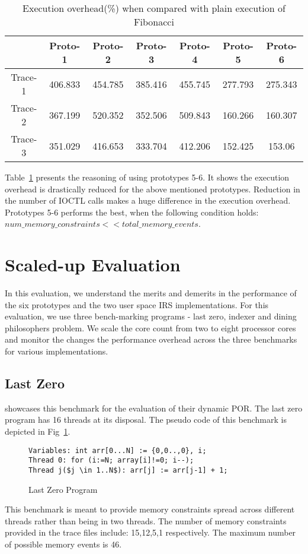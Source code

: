 \begin{table}[h]
\begin{center}
 \begin{tabular}{|c c c c c c c|} 
 \hline
 & Proto-1 & Proto-2 & Proto-3 & Proto-4 & Proto-5 & Proto-6\\ %
 \hline
 Trace-1 & 406.833 & 454.785 & 385.416 & 455.745 & 277.793 & 275.343 \\ 
 Trace-2 & 367.199 & 520.352 & 352.506 & 509.843 & 160.266 & 160.307 \\
 Trace-3 & 351.029 & 416.653 & 333.704 & 412.206 & 152.425 & 153.06\\
 \hline
\end{tabular}
\end{center}
\caption{Execution overhead(\%) when compared with plain execution of Fibonacci}
\label{fib_exec_over}
\end{table}

Table~\ref{fib_exec_over} presents the reasoning of using prototypes 5-6. 
It shows the execution overhead is drastically reduced for the above mentioned prototypes. 
Reduction in the number of IOCTL calls makes a huge difference in the execution overhead. 
Prototypes 5-6 performs the best, when the following condition holds:
$num\_memory\_constraints << total\_memory\_events$.

\section{Scaled-up Evaluation}

In this evaluation, we understand the merits and demerits in the performance of the six prototypes and the two user space IRS implementations. 
For this evaluation, we use three bench-marking programs - last zero, indexer and dining philosophers problem. 
We scale the core count from two to eight processor cores and monitor the changes the performance overhead across the three benchmarks for various implementations. 

\subsection{Last Zero}

\citet{abdulla2014optimal} showcases this benchmark for the evaluation of their dynamic POR. 
The last zero program has 16 threads at its disposal. 
The pseudo code of this benchmark is depicted in Fig~\ref{code_lastzero}. 
\begin{figure}[h]
\begin{lstlisting}[mathescape=true,style=customc]
Variables: int arr[0...N] := {0,0..,0}, i;
Thread 0: for (i:=N; array[i]!=0; i--);
Thread j($j \in 1..N$): arr[j] := arr[j-1] + 1;
\end{lstlisting}
\caption{Last Zero Program}
\label{code_lastzero}
\end{figure}
This benchmark is meant to provide memory constraints spread across different threads rather than being in two threads. 
The number of memory constraints provided in the trace files include: 15,12,5,1 respectively. 
The maximum number of possible memory events is 46.

